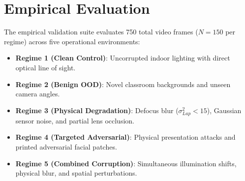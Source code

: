 \documentclass[conference]{IEEEtran}
\begin{document}
\section{Empirical Evaluation}
The empirical validation suite evaluates 750 total video frames ($N=150$ per regime) across five operational environments:
\begin{itemize}
    \item \textbf{Regime 1 (Clean Control)}: Uncorrupted indoor lighting with direct optical line of sight.
    \item \textbf{Regime 2 (Benign OOD)}: Novel classroom backgrounds and unseen camera angles.
    \item \textbf{Regime 3 (Physical Degradation)}: Defocus blur ($\sigma_{Lap}^2 < 15$), Gaussian sensor noise, and partial lens occlusion.
    \item \textbf{Regime 4 (Targeted Adversarial)}: Physical presentation attacks and printed adversarial facial patches.
    \item \textbf{Regime 5 (Combined Corruption)}: Simultaneous illumination shifts, physical blur, and spatial perturbations.
\end{itemize}

\begin{table}[htbp]
\caption{Paper 22 Five-Regime Latency and Risk Calibration Results}
\centering
{}
\label{tab:regimes}
\end{table}
\end{document}
